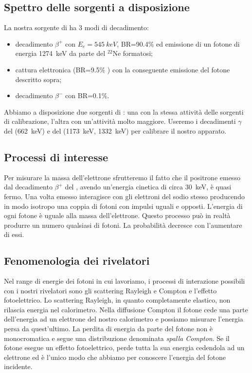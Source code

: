 \subsection{Spettro delle sorgenti a disposizione}

La nostra sorgente di \na{} ha 3 modi di decadimento:
\begin{itemize}
\item decadimento $\beta^+$ con $E_e=\SI{545}{keV}$, BR=90.4\% ed emissione di un fotone di energia \SI{1274}{keV} da parte del $^{22}$Ne formatosi;
\item cattura elettronica (BR=9.5\% ) con la conseguente emissione del fotone descritto sopra;
\item decadimento $\beta^-$ con BR=0.1\%.
\end{itemize}

Abbiamo a disposizione due sorgenti di \na{}: una con la stessa attività delle sorgenti di calibrazione, l'altra con un'attività molto maggiore.
Useremo i decadimenti $\gamma$ del \cs{} (\SI{662}{keV}) e del \co{} (\SI{1173}{keV}, \SI{1332}{keV}) per calibrare il nostro apparato.

\subsection{Processi di interesse}

Per misurare la massa dell'elettrone sfrutteremo il fatto che il positrone emesso dal decadimento $\beta^+$ del \na{}, avendo un'energia cinetica di circa \SI{30}{keV}, è quasi fermo. 
Una volta emesso interagisce con gli elettroni del sodio stesso producendo in modo isotropo una coppia di fotoni con impulsi uguali e opposti. L'energia di ogni fotone è uguale alla massa dell'elettrone. Questo processo può in realtà produrre un numero qualsiasi di fotoni. La probabilità decresce con l'aumentare di essi.


\subsection{Fenomenologia dei rivelatori}

Nel range di energie dei fotoni in cui lavoriamo, i processi di interazione possibili con i nostri rivelatori sono gli scattering Rayleigh e Compton e l'effetto fotoelettrico.
Lo scattering Rayleigh, in quanto completamente elastico, non rilascia energia nel calorimetro.
Nella diffusione Compton il fotone cede una parte dell'energia ad un elettrone del nostro calorimetro e possiamo misurare l'energia persa da quest'ultimo. La perdita di energia da parte del fotone non è monocromatica e segue una distribuzione denominata \emph{spalla Compton}.
Se il fotone esegue un effetto fotoelettrico, perde tutta la sua energia cedendola ad un elettrone ed è l'unico modo che abbiamo per conoscere l'energia del fotone incidente.


